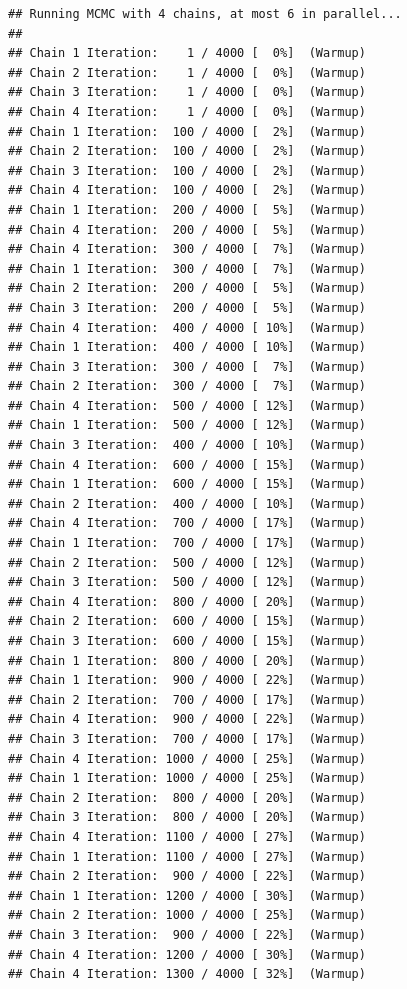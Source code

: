 \documentclass[
]{article}
\begin{document}
\begin{verbatim}
## Running MCMC with 4 chains, at most 6 in parallel...
## 
## Chain 1 Iteration:    1 / 4000 [  0%]  (Warmup) 
## Chain 2 Iteration:    1 / 4000 [  0%]  (Warmup) 
## Chain 3 Iteration:    1 / 4000 [  0%]  (Warmup) 
## Chain 4 Iteration:    1 / 4000 [  0%]  (Warmup) 
## Chain 1 Iteration:  100 / 4000 [  2%]  (Warmup) 
## Chain 2 Iteration:  100 / 4000 [  2%]  (Warmup) 
## Chain 3 Iteration:  100 / 4000 [  2%]  (Warmup) 
## Chain 4 Iteration:  100 / 4000 [  2%]  (Warmup) 
## Chain 1 Iteration:  200 / 4000 [  5%]  (Warmup) 
## Chain 4 Iteration:  200 / 4000 [  5%]  (Warmup) 
## Chain 4 Iteration:  300 / 4000 [  7%]  (Warmup) 
## Chain 1 Iteration:  300 / 4000 [  7%]  (Warmup) 
## Chain 2 Iteration:  200 / 4000 [  5%]  (Warmup) 
## Chain 3 Iteration:  200 / 4000 [  5%]  (Warmup) 
## Chain 4 Iteration:  400 / 4000 [ 10%]  (Warmup) 
## Chain 1 Iteration:  400 / 4000 [ 10%]  (Warmup) 
## Chain 3 Iteration:  300 / 4000 [  7%]  (Warmup) 
## Chain 2 Iteration:  300 / 4000 [  7%]  (Warmup) 
## Chain 4 Iteration:  500 / 4000 [ 12%]  (Warmup) 
## Chain 1 Iteration:  500 / 4000 [ 12%]  (Warmup) 
## Chain 3 Iteration:  400 / 4000 [ 10%]  (Warmup) 
## Chain 4 Iteration:  600 / 4000 [ 15%]  (Warmup) 
## Chain 1 Iteration:  600 / 4000 [ 15%]  (Warmup) 
## Chain 2 Iteration:  400 / 4000 [ 10%]  (Warmup) 
## Chain 4 Iteration:  700 / 4000 [ 17%]  (Warmup) 
## Chain 1 Iteration:  700 / 4000 [ 17%]  (Warmup) 
## Chain 2 Iteration:  500 / 4000 [ 12%]  (Warmup) 
## Chain 3 Iteration:  500 / 4000 [ 12%]  (Warmup) 
## Chain 4 Iteration:  800 / 4000 [ 20%]  (Warmup) 
## Chain 2 Iteration:  600 / 4000 [ 15%]  (Warmup) 
## Chain 3 Iteration:  600 / 4000 [ 15%]  (Warmup) 
## Chain 1 Iteration:  800 / 4000 [ 20%]  (Warmup) 
## Chain 1 Iteration:  900 / 4000 [ 22%]  (Warmup) 
## Chain 2 Iteration:  700 / 4000 [ 17%]  (Warmup) 
## Chain 4 Iteration:  900 / 4000 [ 22%]  (Warmup) 
## Chain 3 Iteration:  700 / 4000 [ 17%]  (Warmup) 
## Chain 4 Iteration: 1000 / 4000 [ 25%]  (Warmup) 
## Chain 1 Iteration: 1000 / 4000 [ 25%]  (Warmup) 
## Chain 2 Iteration:  800 / 4000 [ 20%]  (Warmup) 
## Chain 3 Iteration:  800 / 4000 [ 20%]  (Warmup) 
## Chain 4 Iteration: 1100 / 4000 [ 27%]  (Warmup) 
## Chain 1 Iteration: 1100 / 4000 [ 27%]  (Warmup) 
## Chain 2 Iteration:  900 / 4000 [ 22%]  (Warmup) 
## Chain 1 Iteration: 1200 / 4000 [ 30%]  (Warmup) 
## Chain 2 Iteration: 1000 / 4000 [ 25%]  (Warmup) 
## Chain 3 Iteration:  900 / 4000 [ 22%]  (Warmup) 
## Chain 4 Iteration: 1200 / 4000 [ 30%]  (Warmup) 
## Chain 4 Iteration: 1300 / 4000 [ 32%]  (Warmup) 

\end{verbatim}
\end{document}
